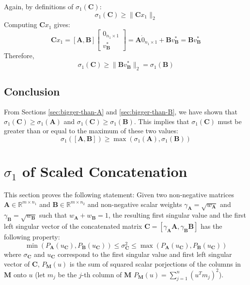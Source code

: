 Again, by definitions of $\sigma_1(\mathbf{C})$:
\[ \sigma_1(\mathbf{C}) \geq \parallel \mathbf{C}x_1 \parallel_2 \]
Computing $\mathbf{C}x_1$ gives:
\[ \mathbf{C}x_1 = [\mathbf{A}, \mathbf{B}] \begin{bmatrix} 0_{n_1 \times 1} \\
v_{\mathbf{B}}^* \end{bmatrix} = \mathbf{A} \dot 0_{n_1 \times 1} + \mathbf{B}
v_{\mathbf{B}}^* = \mathbf{B}v_{\mathbf{B}}^* \]
Therefore,
\[ \sigma_1(\mathbf{C}) \geq \parallel \mathbf{B}v_{\mathbf{B}}^* \parallel_2 =
\sigma_1(\mathbf{B})\]

\subsection{Conclusion}
From Sections \ref{sec:bigger-than-A} and \ref{sec:bigger-than-B}, we have shown
that $\sigma_1(\mathbf{C}) \geq \sigma_1(\mathbf{A})$ and $\sigma_1(\mathbf{C})
\geq \sigma_1(\mathbf{B})$. This implies that $\sigma_1(\mathbf{C})$ must be
greater than or equal to the maximum of these two values:
\[ \sigma_1([\mathbf{A}, \mathbf{B}]) \geq \max(\sigma_1(\mathbf{A}),
\sigma_1(\mathbf{B})) \]

\section{$\sigma_1$ of Scaled Concatenation}
\label{sec:app-scale}
This section proves the following statement:
Given two non-negative matrices $\mathbf{A} \in \mathbb{R}^{m \times n_1}$ and
$\mathbf{\mathbf{B}} \in \mathbb{R}^{m \times n_2}$ and non-negative scalar weights
$\gamma_{\mathbf{A}} = \sqrt{w_{\mathbf{A}}}$ and $\gamma_{\mathbf{\mathbf{B}}} =
\sqrt{w_{\mathbf{\mathbf{B}}}}$ such that $w_{\mathbf{A}} + w_{\mathbf{\mathbf{B}}} = 1$, the
resulting first singular value and the first left
singular vector of the concatenated matrix $\mathbf{C} = [\gamma_{\mathbf{A}}\mathbf{A},
\gamma_{\mathbf{\mathbf{B}}}\mathbf{\mathbf{B}}]$ has the following property:
\[ \min(P_{\mathbf{A}}(u_{\mathbf{C}}),P_{\mathbf{\mathbf{B}}}(u_{\mathbf{C}})) \leq \sigma_{\mathbf{C}}^2 \leq
\max(P_{\mathbf{A}}(u_{\mathbf{C}}),P_{\mathbf{\mathbf{B}}}(u_{\mathbf{C}})) \]
where $\sigma_{\mathbf{C}}$ and $u_{\mathbf{C}}$ correspond to the first singular value and first
left singular vector of $\mathbf{C}$, $P_{\mathbf{M}}(u)$ is the sum of squared scalar porjections
of the columns in $\mathbf{M}$ onto $u$ (let $m_j$ be the $j$-th column of $\mathbf{M}$ $P_{\mathbf{M}}(u)
= \sum_{j=1}^n (u^T m_j)^2$).

